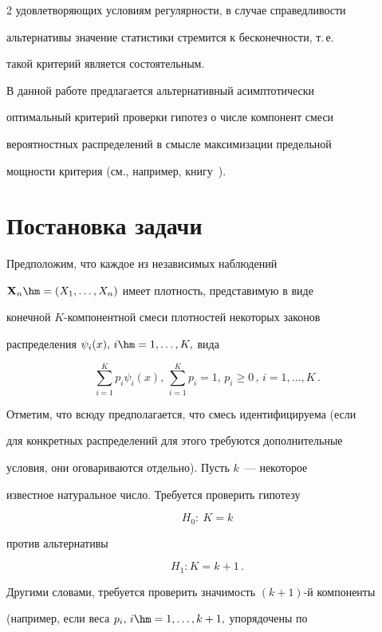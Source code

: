 \begin{multicols}{2}
удовлетворяющих условиям регулярности, в случае справедливости

альтернативы значение статистики стремится к бесконечности, т.\,е.\

такой критерий является состоятельным.



В данной работе предлагается альтернативный асимптотически

оптимальный критерий проверки гипотез о числе компонент смеси

вероятностных распределений в смысле максимизации предельной

мощности критерия (см., например, книгу~\cite{Bening2000}).



\section{Постановка задачи}



Предположим, что каждое из независимых наблюдений

$\textbf{X}_n\hm=(X_1,\ldots,X_n)$ имеет плотность, представимую в виде

конечной $K$-ком\-по\-нент\-ной смеси плотностей некоторых законов

распределения $\psi_i(x),\,i\hm=1,\ldots,K,$ вида

$$

\sum_{i=1}^{K}p_i\psi_i(x),\,\sum_{i=1}^{K}p_i=1,\,p_i\geqslant0\,, \,i=1,\ldots,K\,.

$$



Отметим, что всюду предполагается, что смесь идентифицируема (если

для конкретных распределений для этого требуются дополнительные

условия, они оговариваются отдельно). Пусть $k$~--- некоторое

известное натуральное число. Требуется проверить гипотезу

$$

H_0:\ K=k

$$

против альтернативы

$$

H_1: K=k+1\,.

$$

Другими словами, требуется проверить значимость $(k+1)$-й компоненты

(например, если веса $p_i,\,i\hm=1,\ldots,k+1,$ упорядочены по


\end{multicols}
